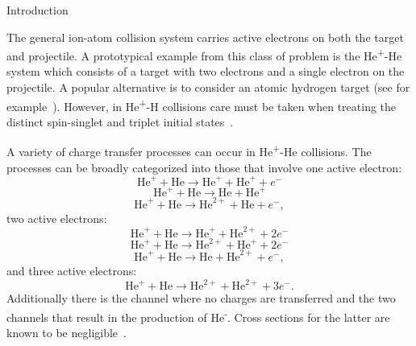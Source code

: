 \documentclass[aps, pra, reprint, groupedaddress, amsfonts, longbibliography,
               amsmath, amssymb, showpacs, nofootinbib]{revtex4-1}
\begin{document}
\begin{section}{Introduction \label{sec:intro}}

   The general ion-atom collision system carries active electrons on both the target and projectile. A
   prototypical example from this class of problem is the He\textsuperscript{+}-He system which consists
   of a target with two electrons and a single electron on the projectile. A popular alternative is to
   consider an atomic hydrogen target (see for example~\cite{hEx1, hEx2}). However, in
   He\textsuperscript{+}-H collisions care must be taken when treating the distinct spin-singlet and
   triplet initial states~\cite{heph}.

   A variety of charge transfer processes can occur in He\textsuperscript{+}-He collisions. The
   processes can be broadly categorized into those that involve one active electron:
   \begin{equation} \label{eq:tpi111}
      \mathrm{He}^+ + \mathrm{He} \rightarrow \mathrm{He}^+ + \mathrm{He}^+ + e^-
   \end{equation}
   \begin{equation} \label{eq:tpi120}
      \mathrm{He}^+ + \mathrm{He} \rightarrow \mathrm{He} + \mathrm{He}^+
   \end{equation}
   \begin{equation} \label{eq:tpi201}
      \mathrm{He}^+ + \mathrm{He} \rightarrow \mathrm{He}^{2+} + \mathrm{He} + e^-,
   \end{equation}
   two active electrons:
   \begin{equation} \label{eq:tpi012}
      \mathrm{He}^+ + \mathrm{He} \rightarrow \mathrm{He}^+ + \mathrm{He}^{2+} + 2e^-
   \end{equation}
   \begin{equation} \label{eq:tpi102}
      \mathrm{He}^+ + \mathrm{He} \rightarrow \mathrm{He}^{2+} + \mathrm{He}^+ + 2e^-
   \end{equation}
   \begin{equation} \label{eq:tpi021}
      \mathrm{He}^+ + \mathrm{He} \rightarrow \mathrm{He} + \mathrm{He}^{2+} + e^-,
   \end{equation}
   and three active electrons:
   \begin{equation} \label{eq:tpi003}
      \mathrm{He}^+ + \mathrm{He} \rightarrow \mathrm{He}^{2+} + \mathrm{He}^{2+} + 3e^{-}.
   \end{equation}
   Additionally there is the channel where no charges are transferred and the two channels that result
   in the production of He\textsuperscript{-}. Cross sections for the latter are known to be
   negligible~\cite{metahe, neghe-neg}.


\end{section}
\end{document}
